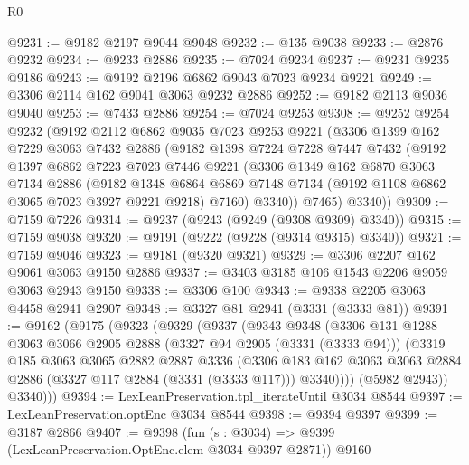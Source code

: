 \begin{lexlean}{R0}
\begin{coremodule}
@9231 := @9182 @2197 @9044 @9048
@9232 := @135 @9038
@9233 := @2876 @9232
@9234 := @9233 @2886
@9235 := @7024 @9234
@9237 := @9231 @9235 @9186
@9243 := @9192 @2196 @6862 @9043 @7023 @9234 @9221
@9249 := @3306 @2114 @162 @9041 @3063 @9232 @2886
@9252 := @9182 @2113 @9036 @9040
@9253 := @7433 @2886
@9254 := @7024 @9253
@9308 := @9252
    @9254
    @9232
    (@9192
      @2112
      @6862
      @9035
      @7023
      @9253
      @9221
      (@3306
        @1399
        @162
        @7229
        @3063
        @7432
        @2886
        (@9182
          @1398
          @7224
          @7228
          @7447
          @7432
          (@9192
            @1397
            @6862
            @7223
            @7023
            @7446
            @9221
            (@3306
              @1349
              @162
              @6870
              @3063
              @7134
              @2886
              (@9182
                @1348
                @6864
                @6869
                @7148
                @7134
                (@9192 @1108 @6862 @3065 @7023 @3927 @9221 @9218)
                @7160)
              @3340))
          @7465)
        @3340))
@9309 := @7159 @7226
@9314 := @9237 (@9243 (@9249 (@9308 @9309) @3340))
@9315 := @7159 @9038
@9320 := @9191 (@9222 (@9228 (@9314 @9315) @3340))
@9321 := @7159 @9046
@9323 := @9181 (@9320 @9321)
@9329 := @3306 @2207 @162 @9061 @3063 @9150 @2886
@9337 := @3403 @3185 @106 @1543 @2206 @9059 @3063 @2943 @9150
@9338 := @3306 @100
@9343 := @9338 @2205 @3063 @4458 @2941 @2907
@9348 := @3327 @81 @2941 (@3331 (@3333 @81))
@9391 := @9162
    (@9175
      (@9323
        (@9329
          (@9337
            (@9343
              @9348
              (@3306
                @131
                @1288
                @3063
                @3066
                @2905
                @2888
                (@3327 @94 @2905 (@3331 (@3333 @94)))
                (@3319
                  @185
                  @3063
                  @3065
                  @2882
                  @2887
                  @3336
                  (@3306
                    @183
                    @162
                    @3063
                    @3063
                    @2884
                    @2886
                    (@3327 @117 @2884 (@3331 (@3333 @117)))
                    @3340))))
            (@5982 @2943))
          @3340)))
@9394 := LexLeanPreservation.tpl_iterateUntil @3034 @8544
@9397 := LexLeanPreservation.optEnc @3034 @8544
@9398 := @9394 @9397
@9399 := @3187 @2866
@9407 := @9398 (fun (s : @3034) => @9399 (LexLeanPreservation.OptEnc.elem @3034 @9397 @2871)) @9160

\end{coremodule}
\end{lexlean}
